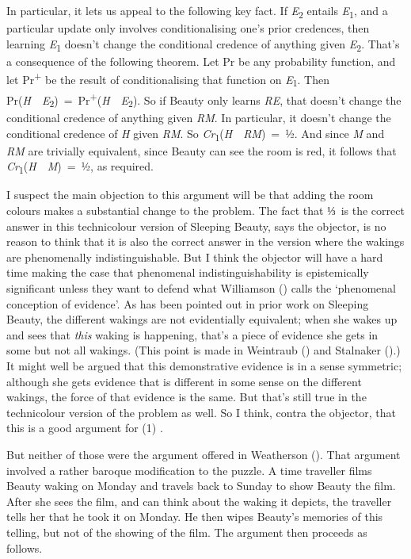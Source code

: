 \documentclass[
  11pt,
  letterpaper,
  DIV=11,
  numbers=noendperiod,
  twoside]{scrartcl}
\begin{document}
In particular, it lets us appeal to the following key fact. If
\emph{E}\textsubscript{2} entails \emph{E}\textsubscript{1}, and a
particular update only involves conditionalising one's prior credences,
then learning \emph{E}\textsubscript{1} doesn't change the conditional
credence of anything given \emph{E}\textsubscript{2}. That's a
consequence of the following theorem. Let Pr be any probability
function, and let Pr\textsuperscript{+} be the result of
conditionalising that function on \emph{E}\textsubscript{1}. Then
Pr(\emph{H}~\textbar~\emph{E}\textsubscript{2})~=~Pr\textsuperscript{+}(\emph{H}~\textbar~\emph{E}\textsubscript{2}).
So if Beauty only learns \emph{RE}, that doesn't change the conditional
credence of anything given \emph{RM}. In particular, it doesn't change
the conditional credence of \emph{H} given \emph{RM}. So
\emph{Cr}\textsubscript{1}(\emph{H}~\textbar~\emph{RM})~=~½. And since
\emph{M} and \emph{RM} are trivially equivalent, since Beauty can see
the room is red, it follows that
\emph{Cr}\textsubscript{1}(\emph{H}~\textbar~\emph{M})~=~½, as required.

I suspect the main objection to this argument will be that adding the
room colours makes a substantial change to the problem. The fact that
⅓~is the correct answer in this technicolour version of Sleeping Beauty,
says the objector, is no reason to think that it is also the correct
answer in the version where the wakings are phenomenally
indistinguishable. But I think the objector will have a hard time making
the case that phenomenal indistinguishability is epistemically
significant unless they want to defend what Williamson
() calls the `phenomenal
conception of evidence'. As has been pointed out in prior work on
Sleeping Beauty, the different wakings are not evidentially equivalent;
when she wakes up and sees that \emph{this} waking is happening, that's
a piece of evidence she gets in some but not all wakings. (This point is
made in Weintraub () and Stalnaker
().) It might well be argued that this
demonstrative evidence is in a sense symmetric; although she gets
evidence that is different in some sense on the different wakings, the
force of that evidence is the same. But that's still true in the
technicolour version of the problem as well. So I think, contra the
objector, that this is a good argument for (1) .

But neither of those were the argument offered in Weatherson
(). That argument involved a rather
baroque modification to the puzzle. A time traveller films Beauty waking
on Monday and travels back to Sunday to show Beauty the film. After she
sees the film, and can think about the waking it depicts, the traveller
tells her that he took it on Monday. He then wipes Beauty's memories of
this telling, but not of the showing of the film. The argument then
proceeds as follows.
\end{document}
